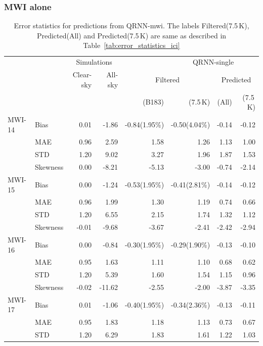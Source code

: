 \documentclass[amt, manuscript]{copernicus}
\begin{document}
\subsubsection{MWI alone}
%
\begin{table}[t]
	\caption{Error statistics for predictions from QRNN-mwi. The labels Filtered(7.5\,K), Predicted(All) and Predicted(7.5\,K) are same as described in Table~\ref{tab:error_statistics_ici}}
	\label{tab:statistics_mwi-alone}
	\begin{tabular}{llrr|rr|rr}
		\tophline
		&&\multicolumn{2}{c|}{Simulations}& &\multicolumn{3}{c}{QRNN-single} \\
		\cline{3-4}
		\cline{6-8}
		&&   Clear-sky &   All-sky & \multicolumn{2}{c}{Filtered} & \multicolumn{2}{c}{Predicted} \\
		&&&&						(B183) & (7.5\,K)& (All) & (7.5\,K)\\
		\middlehline
		MWI-14 		&Bias     & 0.01 & -1.86 & -0.84(1.95\%) & -0.50(4.04\%) & -0.14 & -0.12 \\
					&MAE      & 0.96 &  2.59 &  1.58 &  1.26 &  1.13 &  1.00 \\
					&STD      & 1.20 &  9.02 &  3.27 &  1.96 &  1.87 &  1.53 \\
					&Skewness & 0.00 & -8.21 & -5.13 & -3.00 & -0.74 & -2.14 \\
		\middlehline
		MWI-15 		&Bias     &  0.00 & -1.24 & -0.53(1.95\%) & -0.41(2.81\%) & -0.14 & -0.12 \\
					&MAE      &  0.96 &  1.99 &  1.30 &  1.19 &  0.74 &  0.66 \\
					&STD      &  1.20 &  6.55 &  2.15 &  1.74 &  1.32 &  1.12 \\
					&Skewness & -0.01 & -9.68 & -3.67 & -2.41 & -2.42 & -2.94 \\
		\middlehline	
		MWI-16 		&Bias     &  0.00 &  -0.84 & -0.30(1.95\%) & -0.29(1.90\%) & -0.13 & -0.10 \\
					&MAE      &  0.95 &   1.63 &  1.11 &  1.10 &  0.68 &  0.62 \\
					&STD      &  1.20 &   5.39 &  1.60 &  1.54 &  1.15 &  0.96 \\
					&Skewness & -0.02 & -11.62 & -2.55 & -2.00 & -3.87 & -3.35 \\	
		\middlehline			
		MWI-17 		&Bias     &  0.01 &  -1.06 & -0.40(1.95\%) & -0.34(2.36\%) & -0.13 & -0.11 \\
					&MAE      &  0.95 &   1.83 &  1.18 &  1.13 &  0.73 &  0.67 \\
					&STD      &  1.20 &   6.29 &  1.83 &  1.61 &  1.22 &  1.03 \\

\end{tabular}
\end{table}
\end{document}
